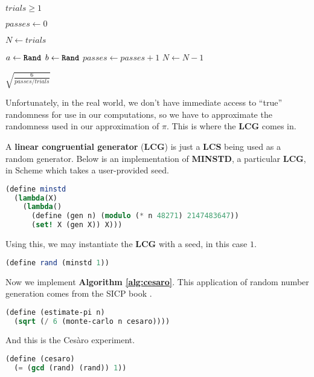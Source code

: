 \documentclass[11pt]{article}
\newcommand{\upright}[1]{{\bf \ttfamily #1}}
\begin{document}
\begin{algorithm}
\caption{Ces\`{a}ro's method for approximating $\pi$}\label{alg:cesaro}
\begin{algorithmic}
\Require $trials \geq 1$

\State $passes \gets 0$

\State $N \gets trials$

\State $a \gets \mbox{\upright{Rand}}$
\State $b \gets \mbox{\upright{Rand}}$
    \State $passes \gets passes + 1$
\EndIf
\State $N \gets N - 1$
\EndWhile

\Return $\displaystyle{\sqrt{\frac{6}{passes / trials}}}$ 
\end{algorithmic}
\end{algorithm}

Unfortunately, in the real world, we don't have immediate access to ``true'' randomness for use in our computations, so we have to approximate the randomness used in our approximation of $\pi$. This is where the \upright{LCG} comes in.

A {\bf linear congruential generator} (\upright{LCG}) is just a \upright{LCS} being used as a random generator. Below is an implementation of \upright{MINSTD}, a particular \upright{LCG}, in Scheme which takes a user-provided seed.

\begin{lstlisting}[language=Scheme]
(define minstd
  (lambda(X)
    (lambda()
      (define (gen n) (modulo (* n 48271) 2147483647))
      (set! X (gen X)) X)))
\end{lstlisting}

Using this, we may instantiate the \upright{LCG} with a seed, in this case $1$.

\begin{lstlisting}[language=Scheme]
(define rand (minstd 1))
\end{lstlisting}

Now we implement \upright{Algorithm \ref{alg:cesaro}}. This application of random number generation comes from the SICP book \cite{abelson_sussman_sussman_1996}.

\begin{lstlisting}[language=Scheme]
(define (estimate-pi n)
  (sqrt (/ 6 (monte-carlo n cesaro))))
\end{lstlisting}

And this is the Ces\`{a}ro experiment.

\begin{lstlisting}[language=Scheme]
(define (cesaro)
  (= (gcd (rand) (rand)) 1))
\end{lstlisting}
\end{document}
